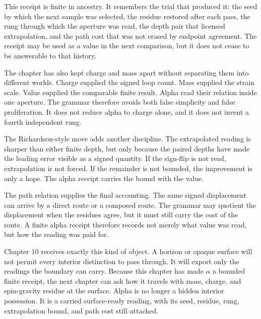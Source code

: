 This receipt is finite in ancestry. It remembers the trial that produced it:
the seed by which the next sample was selected, the residue restored after
each pass, the rung through which the aperture was read, the depth pair that
licensed extrapolation, and the path cost that was not erased by endpoint
agreement. The receipt may be used as a value in the next comparison, but it
does not cease to be answerable to that history.

The chapter has also kept charge and mass apart without separating them into
different worlds. Charge supplied the signed loop count. Mass supplied the
strain scale. Value supplied the comparable finite result. Alpha read their
relation inside one aperture. The grammar therefore avoids both false
simplicity and false proliferation. It does not reduce alpha to charge alone,
and it does not invent a fourth independent rung.

The Richardson-style move adds another discipline. The extrapolated reading
is sharper than either finite depth, but only because the paired depths have
made the leading error visible as a signed quantity. If the sign-flip is not
read, extrapolation is not forced. If the remainder is not bounded, the
improvement is only a hope. The alpha receipt carries the bound with the
value.

The path relation supplies the final accounting. The same signed displacement
can arrive by a direct route or a composed route. The grammar may quotient
the displacement when the residues agree, but it must still carry the cost
of the route. A finite alpha receipt therefore records not merely what value
was read, but how the reading was paid for.

Chapter 10 receives exactly this kind of object. A horizon or opaque surface
will not permit every interior distinction to pass through. It will export
only the readings the boundary can carry. Because this chapter has made
\(\alpha\) a bounded finite receipt, the next chapter can ask how it travels
with mass, charge, and spin-gravity residue at the surface. Alpha is no
longer a hidden interior possession. It is a carried surface-ready reading,
with its seed, residue, rung, extrapolation bound, and path cost still
attached.
